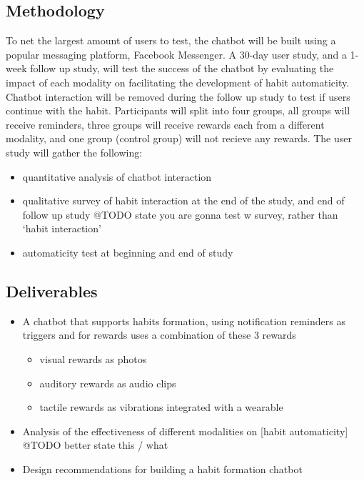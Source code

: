 \subsection*{Methodology}
To net the largest amount of users to test, the chatbot will be built using a popular messaging platform, Facebook Messenger.\newline
\newline
A 30-day user study, and a 1-week follow up study, will test the success of the chatbot by evaluating the impact of each modality on facilitating the development of habit automaticity. Chatbot interaction will be removed during the follow up study to test if users continue with the habit. Participants will split into four groups, all groups will receive reminders, three groups will receive rewards each from a different modality, and one group (control group) will not recieve any rewards.\newline
\newline
The user study will gather the following:
\begin{itemize}
  \item quantitative analysis of chatbot interaction
  \item qualitative survey of habit interaction at the end of the study, and end of follow up study @TODO state you are gonna test w survey, rather than `habit interaction'
  \item automaticity test at beginning and end of study
\end{itemize}

\subsection*{Deliverables}
\begin{itemize}
  \item A chatbot that supports habits formation, using notification reminders as triggers and for rewards uses a combination of these 3 rewards
    \begin{itemize}
      \item visual rewards as photos
      \item auditory rewards as audio clips
      \item tactile rewards as vibrations integrated with a wearable
    \end{itemize}
  \item Analysis of the effectiveness of different modalities on [habit automaticity] @TODO better state this / what
  \item Design recommendations for building a habit formation chatbot
\end{itemize}

